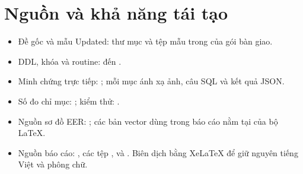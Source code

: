 \section{Nguồn và khả năng tái tạo}
\begin{itemize}
\item Đề gốc và mẫu Updated: thư mục  và tệp mẫu trong  của gói bàn giao.
\item DDL, khóa và routine:  đến .
\item Minh chứng trực tiếp: ; mỗi mục ánh xạ ảnh, câu SQL và kết quả JSON.
\item Số đo chỉ mục: ; kiểm thử: .
\item Nguồn sơ đồ EER: ; các bản vector dùng trong báo cáo nằm tại  của bộ LaTeX.
\item Nguồn báo cáo: , các tệp ,  và . Biên dịch bằng XeLaTeX để giữ nguyên tiếng Việt và phông chữ.
\end{itemize}
